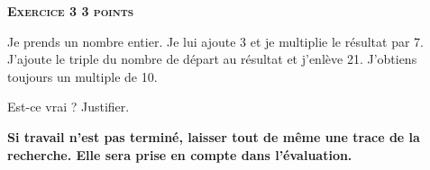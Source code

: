 \textbf{\textsc{Exercice 3 \hfill 3 points}}

\medskip 

\og Je prends un nombre entier. Je lui ajoute 3 et je multiplie le résultat par 7. J'ajoute le triple du nombre de départ au résultat et j'enlève 21. J'obtiens toujours un multiple de 10.\fg

\medskip

Est-ce vrai ? Justifier.
 
\textbf{Si travail n'est pas terminé, laisser tout de même une trace de la recherche. Elle sera prise en compte dans l'évaluation.}
 
\vspace{0,5cm}

